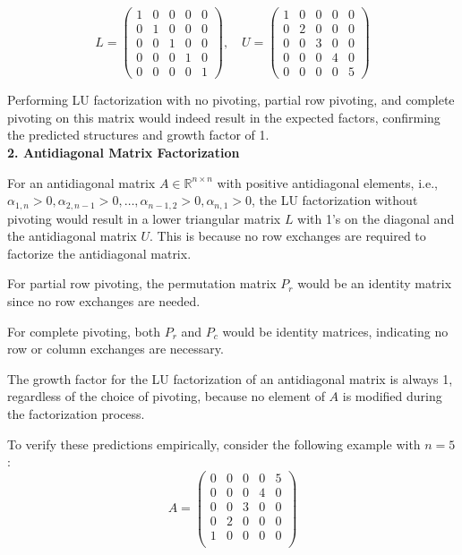 \documentclass{article}
\begin{document}
\[ L = \begin{pmatrix} 1 & 0 & 0 & 0 & 0 \\ 0 & 1 & 0 & 0 & 0 \\ 0 & 0 & 1 & 0 & 0 \\ 0 & 0 & 0 & 1 & 0 \\ 0 & 0 & 0 & 0 & 1 \end{pmatrix}, \quad U = \begin{pmatrix} 1 & 0 & 0 & 0 & 0 \\ 0 & 2 & 0 & 0 & 0 \\ 0 & 0 & 3 & 0 & 0 \\ 0 & 0 & 0 & 4 & 0 \\ 0 & 0 & 0 & 0 & 5 \end{pmatrix} \]


Performing LU factorization with no pivoting, partial row pivoting, and complete pivoting on this matrix would indeed result in the expected factors, confirming the predicted structures and growth factor of 1.
\\
\textbf{2. Antidiagonal Matrix Factorization}

For an antidiagonal matrix $A \in \mathbb{R}^{n \times n}$ with positive antidiagonal elements, i.e., $\alpha_{1,n} > 0, \alpha_{2,n-1} > 0, \ldots, \alpha_{n-1,2} > 0, \alpha_{n,1} > 0$, the LU factorization without pivoting would result in a lower triangular matrix $L$ with 1's on the diagonal and the antidiagonal matrix $U$. This is because no row exchanges are required to factorize the antidiagonal matrix.

For partial row pivoting, the permutation matrix $P_r$ would be an identity matrix since no row exchanges are needed. 

For complete pivoting, both $P_r$ and $P_c$ would be identity matrices, indicating no row or column exchanges are necessary.

The growth factor for the LU factorization of an antidiagonal matrix is always 1, regardless of the choice of pivoting, because no element of $A$ is modified during the factorization process.

To verify these predictions empirically, consider the following example with $n = 5$:
\[
A =
\begin{pmatrix}
0 & 0 & 0 & 0 & 5 \\
0 & 0 & 0 & 4 & 0 \\
0 & 0 & 3 & 0 & 0 \\
0 & 2 & 0 & 0 & 0 \\
1 & 0 & 0 & 0 & 0 \\
\end{pmatrix}
\]
\end{document}
